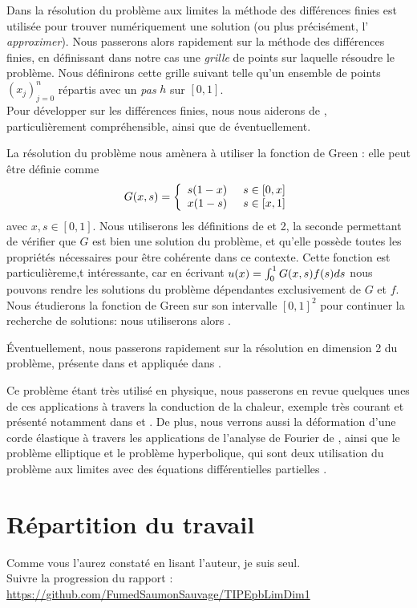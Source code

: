 \documentclass[10pt]{article}
\newcommand{\espace}{\hspace{5mm}}
\begin{document}
\quad Dans la résolution du problème aux limites la méthode des différences finies est utilisée pour trouver numériquement une solution (ou plus précisément, l' \emph{approximer}). Nous passerons alors rapidement sur la méthode des différences finies, en définissant dans notre cas une \emph{grille} de points sur laquelle résoudre le problème.
Nous définirons cette grille suivant \cite{1} telle qu'un ensemble de points $(x_j)_{j = 0}^n$ répartis avec un \emph{pas} $h$ sur $[0,1]$. \\
Pour développer sur les différences finies, nous nous aiderons de \cite{3}, particulièrement compréhensible, ainsi que de \cite{5} éventuellement.

\quad La résolution du problème nous amènera à utiliser la fonction de Green : elle peut être définie comme 
\begin{equation}
G\relax(x, s) = \left\{
    \begin{array}{ll}
        s(1-x) \espace s\in [0,x] \\
        x(1-s) \espace s\in [x, 1]
    \end{array}
\right.
\end{equation}
avec $x,s \in [0,1]$. Nous utiliserons les définitions de \cite{1} et {2}, la seconde permettant de vérifier que $G$ est bien une solution du problème, et qu'elle possède toutes les propriétés nécessaires pour être cohérente dans ce contexte. Cette fonction est particulièreme,t intéressante, car en écrivant $u(x) = \int_0^1 G\relax(x, s) f\relax(s) ds$ nous pouvons rendre les solutions du problème dépendantes exclusivement de $G$ et $f$. Nous étudierons la fonction de Green sur son intervalle $[0,1]^2$ pour continuer la recherche de solutions: nous utiliserons alors \cite{6}.

\quad Éventuellement, nous passerons rapidement sur la résolution en dimension 2 du problème, présente dans \cite{1} et appliquée dans \cite{5}.

\quad Ce problème étant très utilisé en physique, nous passerons en revue quelques unes de ces applications à travers la conduction de la chaleur,  exemple très courant et présenté notamment dans \cite{5} et \cite{7}.
De plus, nous verrons aussi la déformation d'une corde élastique à travers les applications de l'analyse de Fourier de \cite{7}, ainsi que le problème elliptique et le problème hyperbolique, qui sont deux utilisation du problème aux limites avec des équations différentielles partielles \cite{6}.

\section{Répartition du travail}
\quad Comme vous l'aurez constaté en lisant l'auteur, je suis seul.\\
Suivre la progression du rapport : \href{https://github.com/FumedSaumonSauvage/TIPEpbLimDim1}{https://github.com/FumedSaumonSauvage/TIPEpbLimDim1}
\end{document}
